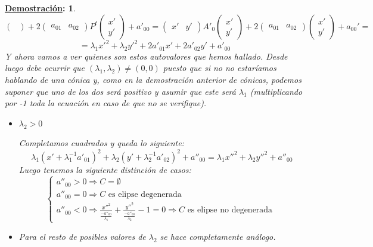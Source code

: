 \documentclass[10pt,a4paper,openright]{book}
\theoremstyle{break}
\newtheorem*{demo}{\underline{Demostración}:}
\begin{document}
\begin{demo}
$$\begin{pmatrix}
\end{pmatrix} + 2 \begin{pmatrix}
a_{01} & a_{02}
\end{pmatrix} P^t \begin{pmatrix}
x' \\ y'
\end{pmatrix} + a'_{00} = \begin{pmatrix}
x' & y'
\end{pmatrix} A'_0  \begin{pmatrix}
x' \\ y'
\end{pmatrix} + 2 \begin{pmatrix}
a_{01} & a_{02}
\end{pmatrix} \begin{pmatrix}
x' \\ y'
\end{pmatrix} + a_{00}' = $$
$$ = \lambda_1 x'^2 + \lambda_2 y'^2 + 2a'_{01}x' + 2 a'_{02}y' + a'_{00} $$
Y ahora vamos a ver quienes son estos autovalores que hemos hallado. Desde luego debe ocurrir que $(\lambda_1, \lambda_2) \neq (0,0)$ puesto que si no no estaríamos hablando de una cónica y, como en la demostración anterior de cónicas, podemos suponer que uno de los dos será positivo y asumir que este será $\lambda_1$ (multiplicando por -1 toda la ecuación en caso de que no se verifique).
\begin{itemize}
\item $\lambda_2 > 0$

Completamos cuadrados y queda lo siguiente:
$$\lambda_1 (x' + \lambda_1^{-1} a'_{01})^2 + \lambda_2 (y' + \lambda_2^{-1} a'_{02})^2 + a''_{00} = \lambda_1 x''^2 + \lambda_2 y''^2 + a''_{00}$$
Luego tenemos la siguiente distinción de casos:
$$\begin{cases} a''_{00} > 0 \Rightarrow C = \emptyset \\ a''_{00} = 0 \Rightarrow C \mbox{ es elipse degenerada } \\ a''_{00} < 0 \Rightarrow \frac{x''^2}{\frac{-a''_{00}}{\lambda_1}} + \frac{y''^2}{\frac{-a''_{00}}{\lambda_2}} - 1 = 0 \Rightarrow C  \mbox{ es elipse no degenerada }\end{cases} $$

\item Para el resto de posibles valores de $\lambda_2$ se hace completamente análogo.
\end{itemize}
\end{demo}
\end{document}
